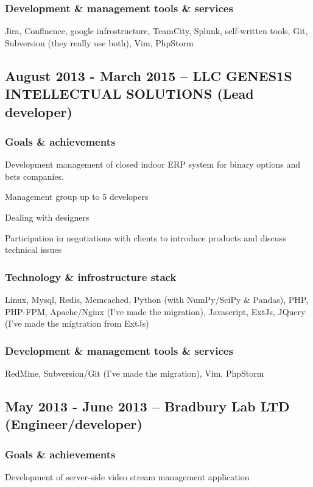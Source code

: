 \documentclass[9pt, a4paper, english]{extarticle}
\begin{document}
    \subsubsection* {Development \& management tools \& services}
      Jira, Confluence, google infrostructure, TeamCity, Splunk, self-written
      tools, Git, Subversion (they really use both), Vim, PhpStorm


  \subsection* {August 2013 - March 2015 -- \textbf{LLC GENES1S INTELLECTUAL SOLUTIONS} (Lead developer)}
    \subsubsection* {Goals \& achievements}
      \begin {list}{\textbullet}{\itemsep=0mm}
        \item Development management of closed indoor ERP system for binary options and bets companies.
        \item Management group up to 5 developers
        \item Dealing with designers
        \item Participation in negotiations with clients to introduce products and discuss technical issues
      \end{list}
    \subsubsection* {Technology \& infrostructure stack}
      Linux, Mysql, Redis, Memcached, Python (with NumPy/SciPy \& Pandas),
      PHP, PHP-FPM, Apache/Nginx (I've made the migration), Javascript,
      ExtJs, JQuery (I've made the migtration from ExtJs)
    \subsubsection* {Development \& management tools \& services}
      RedMine, Subversion/Git (I've made the migration), Vim, PhpStorm


  \subsection* {May 2013 - June 2013 -- \textbf{Bradbury Lab LTD} (Engineer/developer)}
    \subsubsection* {Goals \& achievements}
      Development of server-side video stream management application
\end{document}
